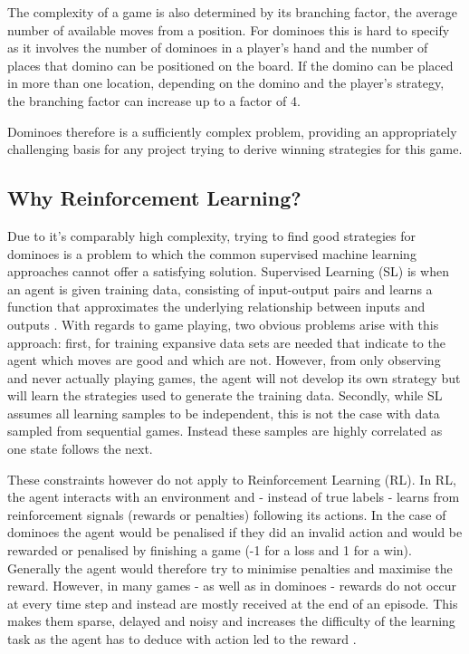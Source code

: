 \documentclass[12pt,a4paper]{article}
\begin{document}
The complexity of a game is also determined by its branching factor, the average number of available moves from a position. For dominoes this is hard to specify as it involves the number of dominoes in a player’s hand and the number of places that domino can be positioned on the board. If the domino can be placed in more than one location, depending on the domino and the player’s strategy, the branching factor can increase up to a factor of 4.

Dominoes therefore is a sufficiently complex problem, providing an appropriately challenging basis for any project trying to derive winning strategies for this game. 


\subsection{Why Reinforcement Learning?}
\label{sec:rl}
Due to it’s comparably high complexity, trying to find good strategies for dominoes is a problem to which the common supervised machine learning approaches cannot offer a satisfying solution. Supervised Learning (SL) is when an agent is given training data, consisting of input-output pairs and learns a function that approximates the underlying relationship between inputs and outputs  \citep{russell_artificial_2010}. With regards to game playing, two obvious problems arise with this approach: first, for training expansive data sets are needed that indicate to the agent which moves are good and which are not. However, from only observing and never actually playing games, the agent will not develop its own strategy but will learn the strategies used to generate the training data. Secondly, while SL assumes all learning samples to be independent, this is not the case with data sampled from sequential games. Instead these samples are highly correlated as one state follows the next. 

These constraints however do not apply to Reinforcement Learning (RL). In RL, the agent interacts with an environment and - instead of true labels - learns from reinforcement signals (rewards or penalties) following its actions. In the case of dominoes the agent would be penalised if they did an invalid action and would be rewarded or penalised by finishing a game (-1 for a loss and 1 for a win). Generally the agent would therefore try to minimise penalties and maximise the reward. However, in many games - as well as in dominoes - rewards do not occur at every time step and instead are mostly received at the end of an episode. This makes them sparse, delayed and noisy \citep{mnih_playing_2013} and increases the difficulty of the learning task as the agent has to deduce with action led to the reward \citep{francois-lavet_introduction_2018}.
\end{document}
